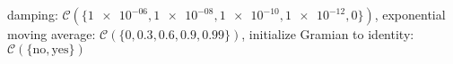 damping: $\mathcal{C}(\{\num[scientific-notation=true]{1e-06},\num[scientific-notation=true]{1e-08},\num[scientific-notation=true]{1e-10},\num[scientific-notation=true]{1e-12},0\})$, exponential moving average: $\mathcal{C}(\{0,\num[scientific-notation=true]{0.3},\num[scientific-notation=true]{0.6},\num[scientific-notation=true]{0.9},\num[scientific-notation=true]{0.99}\})$, initialize Gramian to identity: $\mathcal{C}(\{\text{no},\text{yes}\})$
